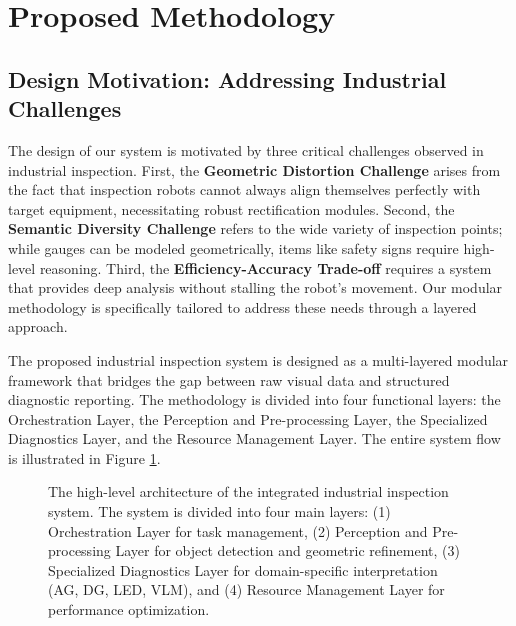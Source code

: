 \section{Proposed Methodology}
\label{sec:methodology}

\subsection{Design Motivation: Addressing Industrial Challenges}
The design of our system is motivated by three critical challenges observed in industrial inspection. First, the \textbf{Geometric Distortion Challenge} arises from the fact that inspection robots cannot always align themselves perfectly with target equipment, necessitating robust rectification modules. Second, the \textbf{Semantic Diversity Challenge} refers to the wide variety of inspection points; while gauges can be modeled geometrically, items like safety signs require high-level reasoning. Third, the \textbf{Efficiency-Accuracy Trade-off} requires a system that provides deep analysis without stalling the robot's movement. Our modular methodology is specifically tailored to address these needs through a layered approach.

The proposed industrial inspection system is designed as a multi-layered modular framework that bridges the gap between raw visual data and structured diagnostic reporting.
 The methodology is divided into four functional layers: the Orchestration Layer, the Perception and Pre-processing Layer, the Specialized Diagnostics Layer, and the Resource Management Layer. The entire system flow is illustrated in Figure \ref{fig:architecture}.

\begin{figure}[t]
\centering
\fbox{\rule{0pt}{3in} \rule{0.95\linewidth}{0pt}} %
\caption{The high-level architecture of the integrated industrial inspection system. The system is divided into four main layers: (1) Orchestration Layer for task management, (2) Perception and Pre-processing Layer for object detection and geometric refinement, (3) Specialized Diagnostics Layer for domain-specific interpretation (AG, DG, LED, VLM), and (4) Resource Management Layer for performance optimization.}
\label{fig:architecture}
\end{figure}


